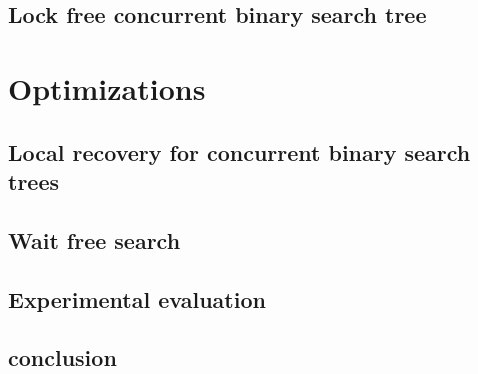 \documentclass[doublespacing]{utdthesis}
\begin{document}
\chapter{Lock free concurrent binary search tree}
\label{chapter:icdcn}


\part{Optimizations}

\chapter{Local recovery for concurrent binary search trees}
\label{chapter:localRecovery}


\chapter{Wait free search}
\label{chapter:waitFreeSearch}


\chapter{Experimental evaluation}
\label{chapter:experiments}


\chapter{conclusion}
\label{chapter:conclusion}


\begin{thesisbib}

\end{thesisbib}

\begin{vita}

\end{vita}
\end{document}
